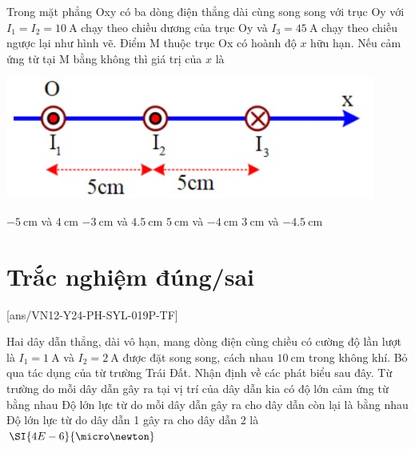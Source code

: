 \begin{ex}
Trong mặt phẳng Oxy có ba dòng điện thẳng dài cùng song song với trục Oy với $I_1=I_2=\SI{10}{\ampere}$ chạy theo chiều dương của trục Oy và $I_3=\SI{45}{\ampere}$ chạy theo chiều ngược lại như hình vẽ. Điểm M thuộc trục Ox có hoành độ $x$ hữu hạn. Nếu cảm ứng từ tại M bằng không thì giá trị của $x$ là
\begin{center}
	\includegraphics[width=0.4\linewidth]{../figs/VN12-Y24-PH-SYL-019P-8}
\end{center}
	\choice
	{\True $\SI{-5}{\centi\meter}$ và $\SI{4}{\centi\meter}$}
	{$\SI{-3}{\centi\meter}$ và $\SI{4.5}{\centi\meter}$}
	{$\SI{5}{\centi\meter}$ và $\SI{-4}{\centi\meter}$}
	{$\SI{3}{\centi\meter}$ và $\SI{-4.5}{\centi\meter}$}
\end{ex}



\section{Trắc nghiệm đúng/sai}
[ans/VN12-Y24-PH-SYL-019P-TF]
\setcounter{ex}{0}
\begin{ex}
	Hai dây dẫn thẳng, dài vô hạn, mang dòng điện cùng chiều có cường độ lần lượt là $I_1=\SI{1}{\ampere}$ và $I_2=\SI{2}{\ampere}$ được đặt song song, cách nhau $\SI{10}{\centi\meter}$ trong không khí. Bỏ qua tác dụng của từ trường Trái Đất. Nhận định về các phát biểu sau đây.
	{Từ trường do mỗi dây dẫn gây ra tại vị trí của dây dẫn kia có độ lớn cảm ứng từ bằng nhau}
	{\True Độ lớn lực từ do mỗi dây dẫn gây ra cho dây dẫn còn lại là bằng nhau}
	{\True Độ lớn lực từ do dây dẫn 1 gây ra cho dây dẫn 2 là $\SI{4E-6}{\micro\newton}$}
	\loigiai{}
\end{ex}


